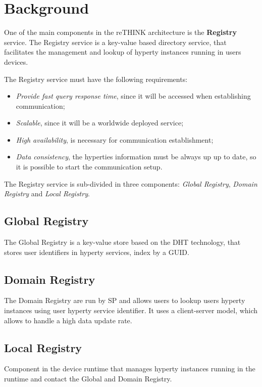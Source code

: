 \section{Background}
\label{section:background}
One of the main components in the reTHINK architecture is the \textbf{Registry} service.
The Registry service is a key-value based directory service, that facilitates the management and lookup of hyperty instances running in users devices.

The Registry service must have the following requirements:
\begin{itemize}
	\item \textit{Provide fast query response time}, since it will be accessed when establishing communication;
	\item \textit{Scalable}, since it will be a worldwide deployed service;
	\item \textit{High availability}, is necessary for communication establishment;
	\item \textit{Data consistency}, the hyperties information must be always up up to date, so it is possible to start the communication setup.
\end{itemize}

The Registry service is sub-divided in three components: \textit{Global Registry}, \textit{Domain Registry} and \textit{Local Registry}.

\subsection{Global Registry}
The Global Registry is a key-value store based on the \ac{DHT} technology, that stores user identifiers in hyperty services, index by a \ac{GUID}.

\subsection{Domain Registry}
The Domain Registry are run by \ac{SP} and allows users to lookup users hyperty instances using user hyperty service identifier.
It uses a client-server model, which allows to handle a high data update rate.

\subsection{Local Registry}
Component in the device runtime that manages hyperty instances running in the runtime and contact the Global and Domain Registry.

